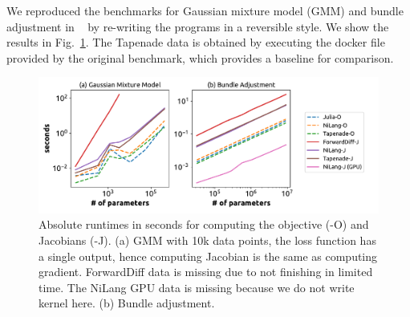 \documentclass{article}
\newcommand{\<}{\langle}
\renewcommand{\>}{\rangle}
\newcommand{\Fig}[1]{Fig.~\ref{#1}}
\theoremstyle{definition}\newtheorem{definition}{\textit{Definition}}
\begin{document}
We reproduced the benchmarks for Gaussian mixture model (GMM) and bundle adjustment in ~\citet{Srajer2018} by re-writing the programs in a reversible style. We show the results in \Fig{fig:gmmba}. The Tapenade data is obtained by executing the docker file provided by the original benchmark, which provides a baseline for comparison.

\begin{figure}[h!]
    \centerline{\includegraphics[width=0.95\columnwidth,trim={0 0cm 0 0},clip]{fig9.pdf}}
    \caption{Absolute runtimes in seconds for computing the objective (-O) and Jacobians (-J). (a) GMM with 10k data points, the loss function has a single output, hence computing Jacobian is the same as computing gradient. ForwardDiff data is missing due to not finishing in limited time. The NiLang GPU data is missing because we do not write kernel here. (b) Bundle adjustment.
    }\label{fig:gmmba}
\end{figure}
\end{document}
